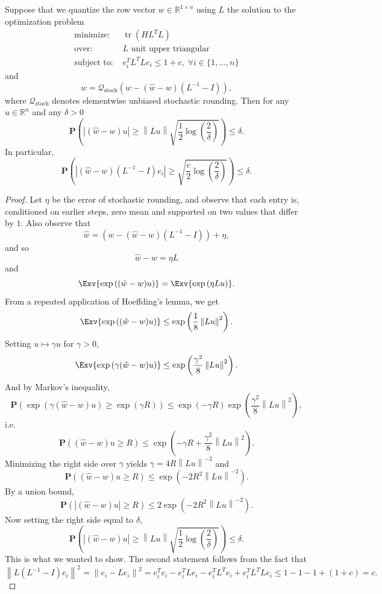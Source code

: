 \begin{toappendix}
\begin{lemma}
Suppose that we quantize the row vector $w \in \mathbb{R}^{1 \times n}$ using $L$ the solution to the optimization problem
\begin{align*}
    \mbox{minimize: } & \operatorname{tr}\left(H L^T L\right) \\
    \mbox{over: } & L \text{ unit upper triangular} \\
    \mbox{subject to: } & e_i^T L^T L e_i \le 1 + c, \; \forall i \in \{1,\ldots,n\}
\end{align*}
and
\[
	\hat w = \mathcal{Q}_{\operatorname{stoch}}\left( w - (\hat w - w) (L^{-1} - I) \right),
\]
where $\mathcal{Q}_{\operatorname{stoch}}$ denotes elementwise unbiased stochastic rounding. Then for any $u \in \mathbb{R}^n$ and any $\delta > 0$
\[
	\mathbf{P}\left( \left| (\hat w - w) u \right| \ge \left\|L u\right\| \sqrt{\frac{1}{2} \log\left( \frac{2}{\delta} \right) } \right) \le \delta.
\]
In particular,
\[
	\mathbf{P}\left( \left| (\hat w - w) (L^{-1} - I) e_i \right| \ge \sqrt{\frac{c}{2} \log\left( \frac{2}{\delta} \right) } \right) \le \delta.
\]
\end{lemma}
\begin{proof}
Let $\eta$ be the error of stochastic rounding, and observe that each entry is, conditioned on earlier steps, zero mean and supported on two values that differ by $1$. Also observe that
\[
	\hat w = \left( w - (\hat w - w) (L^{-1} - I) \right) + \eta,
\]
and so
\[
	\hat w - w = \eta L
\]
and
\[
	\Exv{\exp\left( (\hat w - w) u \right)} = \Exv{\exp\left( \eta L u \right)}.
\]
From a repeated application of Hoeffding's lemma, we get
\[
	\Exv{\exp\left( (\hat w - w) u \right)} \le \exp\left( \frac{1}{8} \left\| L u \right\|^2 \right).
\]
Setting $u \mapsto \gamma u$ for $\gamma > 0$,
\[
	\Exv{\exp\left( \gamma (\hat w - w) u \right)} \le \exp\left( \frac{\gamma^2}{8} \left\| L u \right\|^2 \right).
\]
And by Markov's inequality,
\[
	\mathbf{P}\left( \exp\left( \gamma (\hat w - w) u \right) \ge \exp(\gamma R) \right) \le \exp(-\gamma R) \exp\left( \frac{\gamma^2}{8} \left\| L u \right\|^2 \right),
\]
i.e.
\[
	\mathbf{P}\left( (\hat w - w) u \ge R \right) \le \exp\left( -\gamma R + \frac{\gamma^2}{8} \left\| L u \right\|^2 \right).
\]
Minimizing the right side over $\gamma$ yields $\gamma = 4 R \left\|L u\right\|^{-2}$ and
\[
	\mathbf{P}\left( (\hat w - w) u \ge R \right) \le \exp\left( -2 R^2 \left\|L u\right\|^{-2} \right).
\]
By a union bound,
\[
	\mathbf{P}\left( \left| (\hat w - w) u \right| \ge R \right) \le 2 \exp\left( -2 R^2 \left\|L u\right\|^{-2} \right).
\]
Now setting the right side equal to $\delta$,
\[
	\mathbf{P}\left( \left| (\hat w - w) u \right| \ge \left\|L u\right\| \sqrt{\frac{1}{2} \log\left( \frac{2}{\delta} \right) } \right) \le \delta.
\]
This is what we wanted to show. The second statement follows from the fact that
\[
	 \left\|L (L^{-1} - I) e_i\right\|^2
	 =
	 \left\|e_i - L e_i\right\|^2
	 =
	e_i^T e_i - e_i^T L e_i - e_i^T L^T e_i + e_i^T L^T L e_i
	\le
	1 - 1 - 1 + (1 + c) = c.
\]
\end{proof}


\end{toappendix}
